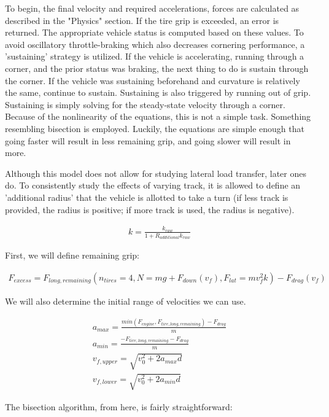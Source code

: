 \documentclass{article}
\begin{document}
To begin, the final velocity and required accelerations, forces are calculated as described in the "Physics" section. If the tire grip is exceeded, an error is returned. The appropriate vehicle status is computed based on these values. To avoid oscillatory throttle-braking which also decreases cornering performance, a 'sustaining' strategy is utilized. If the vehicle is accelerating, running through a corner, and the prior status was braking, the next thing to do is sustain through the corner. If the vehicle was sustaining beforehand and curvature is relatively the same, continue to sustain. Sustaining is also triggered by running out of grip. Sustaining is simply solving for the steady-state velocity through a corner. Because of the nonlinearity of the equations, this is not a simple task. Something resembling bisection is employed. Luckily, the equations are simple enough that going faster will result in less remaining grip, and going slower will result in more.

Although this model does not allow for studying lateral load transfer, later ones do. To consistently study the effects of varying track, it is allowed to define an 'additional radius' that the vehicle is allotted to take a turn (if less track is provided, the radius is positive; if more track is used, the radius is negative).

\begin{align}
	k = \frac{k_{raw}}{1 + R_{additional} k_{raw}}
\end{align}

First, we will define remaining grip:

\begin{align}
	F_{excess} = F_{long,remaining}(n_{tires} = 4, N = m g + F_{down}(v_f), F_{lat} = m v_f^2 k) - F_{drag}(v_f)
\end{align}

We will also determine the initial range of velocities we can use.

\begin{align}
	a_{max} = \frac{min(F_{engine},F_{tire,long,remaining})-F_{drag}}{m} \\
	a_{min} = \frac{-F_{tire,long,remaining}-F_{drag}}{m} \\
	v_{f,upper} = \sqrt{v_0^2 + 2 a_{max} d} \\
	v_{f,lower} = \sqrt{v_0^2 + 2 a_{min} d}
\end{align}

The bisection algorithm, from here, is fairly straightforward:
\end{document}
